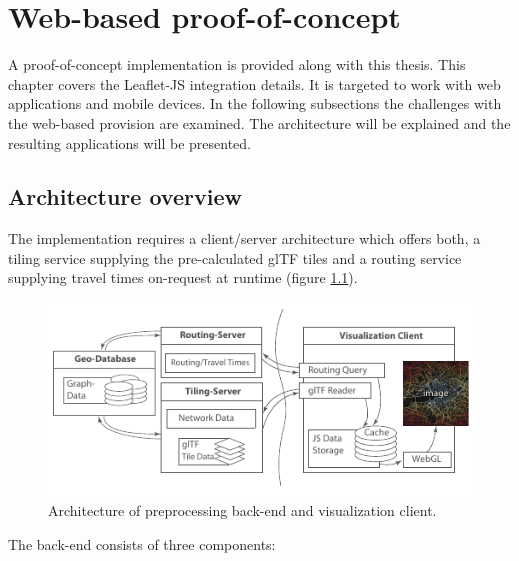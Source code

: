 
\cleardoublepage              %
\chapter{Web-based proof-of-concept}
  \label{chap:imple}
  A proof-of-concept implementation is provided along with this thesis. This
  chapter covers the Leaflet-JS integration details. It is targeted to work with
  web applications and mobile devices. In the following subsections the
  challenges with the web-based provision are examined. The architecture will be
  explained and the resulting applications will be presented.\par

  \section{Architecture overview}
    \label{sec:imple:archi}
    The implementation requires a client/server architecture which offers both,
    a tiling service supplying the pre-calculated glTF tiles and a routing
    service supplying travel times on-request at runtime (figure
    \ref{fig:imple:archi}).\par

    \begin{figure}[h]
      \centering
      \includegraphics[width=\linewidth]{./img/conceptual-overview-bw.pdf}
      \caption{Architecture of preprocessing back-end and visualization client.}
      \label{fig:imple:archi}
    \end{figure}

    The back-end consists of three components:\par

